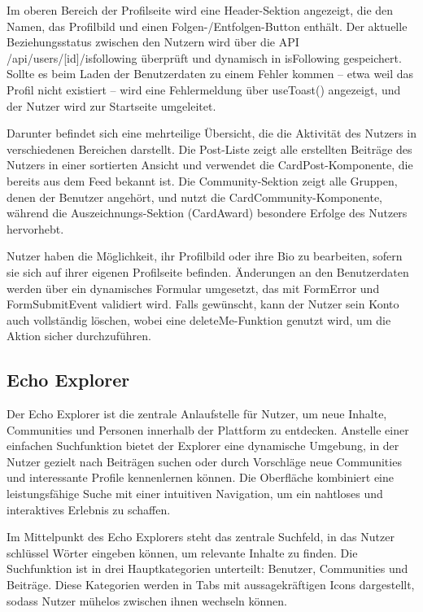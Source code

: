 \documentclass[a4paper,12pt]{article}
\begin{document}
Im oberen Bereich der Profilseite wird eine Header-Sektion angezeigt, die den
Namen, das Profilbild und einen Folgen-/Entfolgen-Button enthält. Der aktuelle
Beziehungsstatus zwischen den Nutzern wird über die API
/api/users/[id]/isfollowing überprüft und dynamisch in isFollowing gespeichert.
Sollte es beim Laden der Benutzerdaten zu einem Fehler kommen – etwa weil das
Profil nicht existiert – wird eine Fehlermeldung über useToast() angezeigt, und
der Nutzer wird zur Startseite umgeleitet.

Darunter befindet sich eine mehrteilige Übersicht, die die Aktivität des
Nutzers in verschiedenen Bereichen darstellt. Die Post-Liste zeigt alle
erstellten Beiträge des Nutzers in einer sortierten Ansicht und verwendet die
CardPost-Komponente, die bereits aus dem Feed bekannt ist. Die
Community-Sektion zeigt alle Gruppen, denen der Benutzer angehört, und nutzt
die CardCommunity-Komponente, während die Auszeichnungs-Sektion (CardAward)
besondere Erfolge des Nutzers hervorhebt.

Nutzer haben die Möglichkeit, ihr Profilbild oder ihre Bio zu bearbeiten,
sofern sie sich auf ihrer eigenen Profilseite befinden. Änderungen an den
Benutzerdaten werden über ein dynamisches Formular umgesetzt, das mit FormError
und FormSubmitEvent validiert wird. Falls gewünscht, kann der Nutzer sein Konto
auch vollständig löschen, wobei eine deleteMe-Funktion genutzt wird, um die
Aktion sicher durchzuführen.

\subsection{Echo Explorer}
Der Echo Explorer ist die zentrale Anlaufstelle für Nutzer, um
neue Inhalte, Communities und Personen innerhalb der Plattform zu entdecken.
Anstelle einer einfachen Suchfunktion bietet der Explorer eine dynamische
Umgebung, in der Nutzer gezielt nach Beiträgen suchen oder durch Vorschläge
neue Communities und interessante Profile kennenlernen können. Die Oberfläche
kombiniert eine leistungsfähige Suche mit einer intuitiven Navigation, um ein
nahtloses und interaktives Erlebnis zu schaffen.

Im Mittelpunkt des Echo Explorers steht das zentrale Suchfeld, in das Nutzer
schlüssel Wörter eingeben können, um relevante Inhalte zu finden. Die
Suchfunktion ist in drei Hauptkategorien unterteilt: Benutzer, Communities und
Beiträge. Diese Kategorien werden in Tabs mit aussagekräftigen Icons
dargestellt, sodass Nutzer mühelos zwischen ihnen wechseln können.
\end{document}

